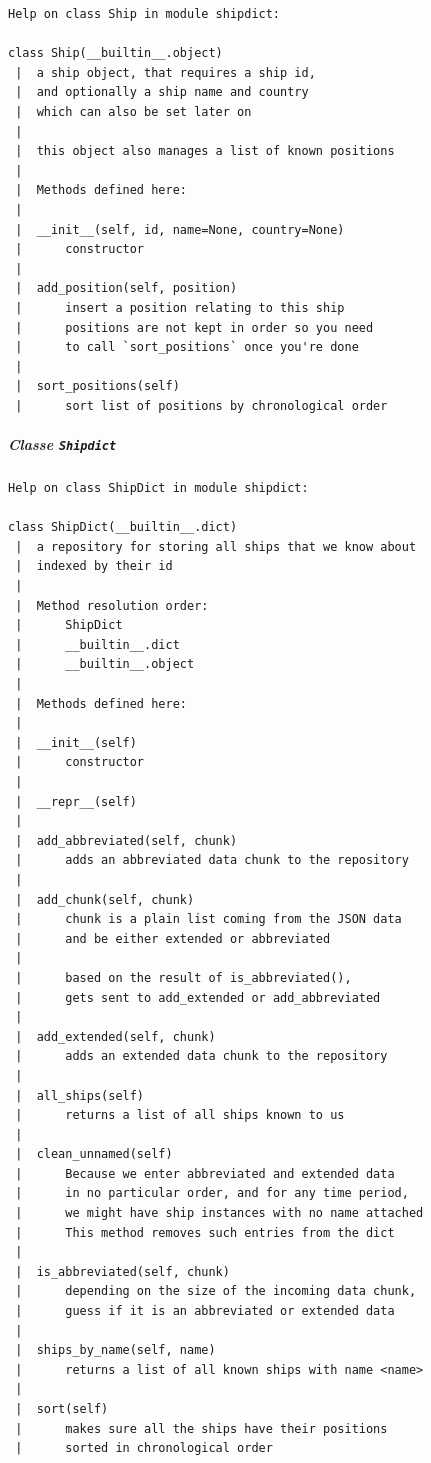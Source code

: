     \begin{verbatim}
Help on class Ship in module shipdict:

class Ship(__builtin__.object)
 |  a ship object, that requires a ship id, 
 |  and optionally a ship name and country
 |  which can also be set later on
 |  
 |  this object also manages a list of known positions
 |  
 |  Methods defined here:
 |  
 |  __init__(self, id, name=None, country=None)
 |      constructor
 |  
 |  add_position(self, position)
 |      insert a position relating to this ship
 |      positions are not kept in order so you need 
 |      to call `sort_positions` once you're done
 |  
 |  sort_positions(self)
 |      sort list of positions by chronological order
\end{verbatim}

    \hypertarget{classe-shipdict}{%
\subparagraph{\texorpdfstring{Classe
\texttt{Shipdict}}{Classe Shipdict}}\label{classe-shipdict}}

    \begin{verbatim}
Help on class ShipDict in module shipdict:

class ShipDict(__builtin__.dict)
 |  a repository for storing all ships that we know about
 |  indexed by their id
 |  
 |  Method resolution order:
 |      ShipDict
 |      __builtin__.dict
 |      __builtin__.object
 |  
 |  Methods defined here:
 |  
 |  __init__(self)
 |      constructor
 |  
 |  __repr__(self)
 |  
 |  add_abbreviated(self, chunk)
 |      adds an abbreviated data chunk to the repository
 |  
 |  add_chunk(self, chunk)
 |      chunk is a plain list coming from the JSON data
 |      and be either extended or abbreviated
 |      
 |      based on the result of is_abbreviated(), 
 |      gets sent to add_extended or add_abbreviated
 |  
 |  add_extended(self, chunk)
 |      adds an extended data chunk to the repository
 |  
 |  all_ships(self)
 |      returns a list of all ships known to us
 |  
 |  clean_unnamed(self)
 |      Because we enter abbreviated and extended data
 |      in no particular order, and for any time period,
 |      we might have ship instances with no name attached
 |      This method removes such entries from the dict
 |  
 |  is_abbreviated(self, chunk)
 |      depending on the size of the incoming data chunk, 
 |      guess if it is an abbreviated or extended data
 |  
 |  ships_by_name(self, name)
 |      returns a list of all known ships with name <name>
 |  
 |  sort(self)
 |      makes sure all the ships have their positions
 |      sorted in chronological order
\end{verbatim}

